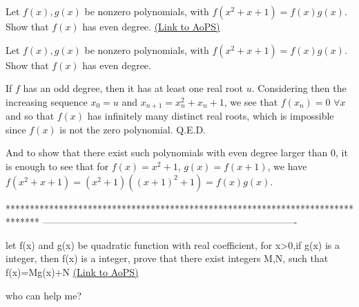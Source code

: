 \begin{problem}
	Let $f(x),g(x)$ be nonzero polynomials, with $f(x^2+x+1)=f(x)g(x)$. Show that $f(x)$ has even degree.
	\flushright \href{https://artofproblemsolving.com/community/c6h471552}{(Link to AoPS)}
\end{problem}



\begin{solution}
	\begin{tcolorbox}Let $f(x),g(x)$ be nonzero polynomials, with $f(x^2+x+1)=f(x)g(x)$. Show that $f(x)$ has even degree.\end{tcolorbox}
If $f$ has an odd degree, then it has at least one real root $u$.
Considering then the increasing sequence $x_0=u$ and $x_{n+1}=x_n^2+x_n+1$, we see that $f(x_n)=0$ $\forall x$ and so that $f(x)$ has infinitely many distinct real roots, which is impossible since $f(x)$ is not the zero polynomial.
Q.E.D.
\end{solution}



\begin{solution}
	And to show that there exist such polynomials with even degree larger than $0$, it is enough to see that for $f(x) = x^2+1$, $g(x) = f(x+1)$, we have $f(x^2+x+1) = (x^2+1)((x+1)^2 + 1) = f(x)g(x)$.
\end{solution}
*******************************************************************************
-------------------------------------------------------------------------------

\begin{problem}
	let f(x) and g(x) be quadratic function with real coefficient, for x>0,if g(x) is a integer, then f(x) is a integer, prove that there exist integers M,N, such that f(x)=Mg(x)+N
	\flushright \href{https://artofproblemsolving.com/community/c6h472459}{(Link to AoPS)}
\end{problem}



\begin{solution}
	who can help me?
\end{solution}



